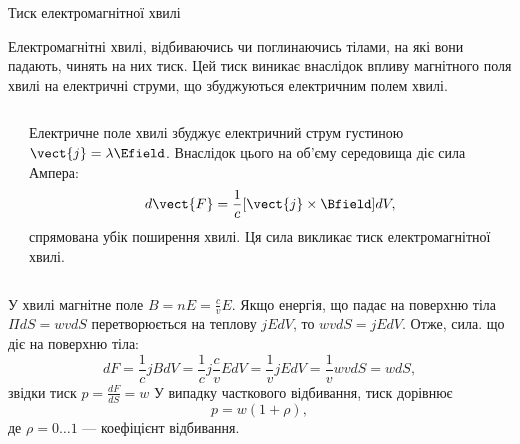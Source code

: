 \documentclass[onlytextwidth]{beamer}
\begin{document}
\begin{frame}{Тиск електромагнітної хвилі}{}\small
	\begin{block}{}\justifying
		Електромагнітні хвилі, відбиваючись чи поглинаючись тілами, на які  вони падають, чинять на них тиск. Цей \alert{тиск виникає внаслідок впливу
		магнітного поля хвилі на електричні струми, що збуджуються електричним полем хвилі}.
	\end{block}
	\begin{columns}
		\begin{column}{0.4\linewidth}\centering
			
		\end{column}
		\begin{column}{0.6\linewidth}
			\begin{block}{}\justifying\small
				Електричне поле хвилі збуджує електричний струм густиною $ \vect{j} = \lambda\Efield $. Внаслідок цього на
				об'єму середовища діє сила Ампера:
                \begin{equation*}
                    d\vect{F} = \frac1c[\vect{j}\times\Bfield] dV,
                \end{equation*}
                спрямована убік поширення хвилі. Ця сила викликає тиск електромагнітної хвилі.
			\end{block}
		\end{column}
	\end{columns}
	\begin{block}{}\justifying\small
		\begin{overprint}
            У хвилі магнітне поле $B = nE = \frac{c}{v}E$. Якщо енергія, що падає на поверхню тіла $\Pi dS = wv dS$
            перетворюється на теплову $ jE dV $, то $  wv dS = jEdV$. Отже, сила. що діє на поверхню тіла:
			\begin{equation*}
				dF = \frac1c j B dV = \frac1c j \frac{c}{v}E dV =  \frac1v jE dV = \frac1v wvdS = w dS,
			\end{equation*}
			звідки тиск $ p = \frac{dF}{dS} = w $
			\onslide<2>
			У випадку часткового відбивання, тиск дорівнює
			\begin{equation*}
				p = w (1 + \rho),
			\end{equation*}
			де $ \rho = 0 \ldots 1$ --- коефіцієнт відбивання.
		\end{overprint}
	\end{block}
\end{frame}
\end{document}

